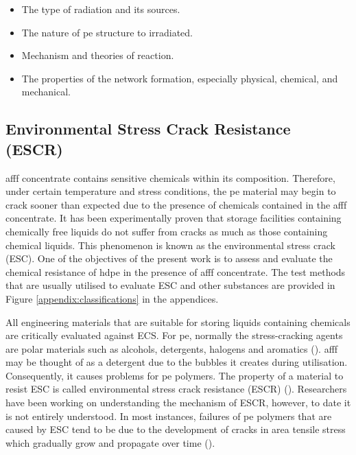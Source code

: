\begin{itemize}
    \item The type of radiation and its sources.
    \item The nature of \acrshort{pe} structure to irradiated.
    \item Mechanism and theories of reaction.
    \item The properties of the network formation, especially physical, chemical, and mechanical. 
\end{itemize}

\subsection{Environmental Stress Crack Resistance (ESCR)}
\acrshort{afff} concentrate contains sensitive chemicals within its composition. Therefore, under certain temperature and stress conditions, the \acrshort{pe} material may begin to crack sooner than expected due to the presence of chemicals contained in the \acrshort{afff} concentrate. It has been experimentally proven that storage facilities containing chemically free liquids do not suffer from cracks as much as those containing chemical liquids. This phenomenon is known as the environmental stress crack (ESC). One of the objectives of the present work is to assess and evaluate the chemical resistance of \acrshort{hdpe} in the presence of \acrshort{afff} concentrate. The test methods that are usually utilised to evaluate ESC and other substances are provided in Figure \ref{appendix:classifications} in the appendices. 

All engineering materials that are suitable for storing liquids containing chemicals are critically evaluated against ECS. For \acrshort{pe}, normally the stress-cracking agents are polar materials such as alcohols, detergents, halogens and aromatics (\cite{gabriel1998history}). \acrshort{afff} may be thought of as a detergent due to the bubbles it creates during utilisation. Consequently, it causes problems for \acrshort{pe} polymers. The property of a material to resist ESC is called environmental stress crack resistance (ESCR) (\cite{gabriel1998history}). Researchers have been working on understanding the mechanism of ESCR, however, to date it is not entirely understood. In most instances, failures of \acrshort{pe} polymers that are caused by ESC tend to be due to the development of cracks in area tensile stress which gradually grow and propagate over time (\cite{peacock2000handbook}).

